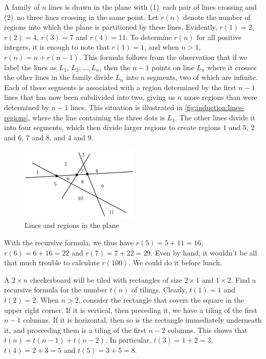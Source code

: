 \begin{example}
  A family of $n$ lines is drawn in the plane with (1)~each pair of
  lines crossing and (2)~no three lines crossing in the same point.
  Let $r(n)$ denote the number of regions into which the plane is
  partitioned by these lines.  Evidently, $r(1)=2$, $r(2)=4$, $r(3)=7$
  and $r(4)=11$.  To determine $r(n)$ for all positive integers, it is
  enough to note that $r(1)=1$, and when $n>1$, $r(n)=n+r(n-1)$.  This
  formula follows from the observation that if we label the lines as
  $L_1$, $L_2, \dots, L_n$, then the $n-1$ points on line $L_n$ where
  it crosses the other lines in the family divide $L_n$ into $n$
  segments, two of which are infinite.  Each of these segments is
  associated with a region determined by the first $n-1$ lines that
  has now been subdivided into two, giving us $n$ more regions than
  were determined by $n-1$ lines. This situation is illustrated in
  \autoref{fig:induction:lines-regions}, where the line containing the
  three dots is $L_4$. The other lines divide it into four segments,
  which then divide larger regions to create regions $1$ and $5$, $2$
  and $6$, $7$ and $8$, and $4$ and $9$.
  \begin{figure}[h]
    \centering
    \includegraphics[width=0.5\textwidth]{induction-figs/lines-regions}
    \caption{Lines and regions in the plane}
    \label{fig:induction:lines-regions}
  \end{figure}
  With the recursive formula, we thus have $r(5)=5+11=16$,
  $r(6)=6+16=22$ and $r(7)=7+22=29$. Even by hand, it wouldn't be all
  that much trouble to calculate $r(100)$.  We could do it before
  lunch.

\end{example}

\begin{example}
  A $2\times n$ checkerboard will be tiled with rectangles of size
  $2\times1$ and $1\times2$.  Find a recursive formula for the number
  $t(n)$ of tilings.  Clearly, $t(1)=1$ and $t(2)=2$.  When $n>2$,
  consider the rectangle that covers the square in the upper right
  corner.  If it is vertical, then preceding it, we have a tiling of
  the first $n-1$ columns.  If it is horizontal, then so is the
  rectangle immediately underneath it, and proceeding them is a tiling
  of the first $n-2$ columns.  This shows that $t(n)=t(n-1)+t(n-2)$.
  In particular, $t(3)=1+2=3$, $t(4)=2+3=5$ and $t(5)= 3+5=8$.
\end{example}

